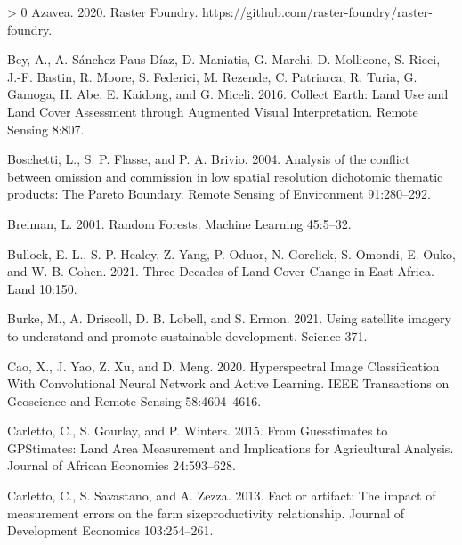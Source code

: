 \documentclass[11pt,a4paper]{article}
\newlength{\cslhangindent}
\newenvironment{CSLReferences}[3] %
 {%
  \setlength{\parindent}{0pt}
  \ifodd #1 \everypar{\setlength{\hangindent}{\cslhangindent}}\ignorespaces\fi
  \ifnum #2 > 0
  \setlength{\parskip}{#2\baselineskip}
  \fi
 }%
 {}
\begin{document}
\hypertarget{refs}{}
\begin{CSLReferences}{1}{0}
\leavevmode\hypertarget{ref-azaveaRasterFoundry2020}{}%
Azavea. 2020. Raster {Foundry}.
https://github.com/raster-foundry/raster-foundry.

\leavevmode\hypertarget{ref-BeyCollectEarthLand2016}{}%
Bey, A., A. Sánchez-Paus Díaz, D. Maniatis, G. Marchi, D. Mollicone, S.
Ricci, J.-F. Bastin, R. Moore, S. Federici, M. Rezende, C. Patriarca, R.
Turia, G. Gamoga, H. Abe, E. Kaidong, and G. Miceli. 2016. Collect
{Earth}: {Land Use} and {Land Cover Assessment} through {Augmented
Visual Interpretation}. Remote Sensing 8:807.

\leavevmode\hypertarget{ref-boschettiAnalysisConflictOmission2004}{}%
Boschetti, L., S. P. Flasse, and P. A. Brivio. 2004. Analysis of the
conflict between omission and commission in low spatial resolution
dichotomic thematic products: {The Pareto Boundary}. Remote Sensing of
Environment 91:280--292.

\leavevmode\hypertarget{ref-BreimanRandomForests2001}{}%
Breiman, L. 2001. Random {Forests}. Machine Learning 45:5--32.

\leavevmode\hypertarget{ref-bullockThreeDecadesLand2021}{}%
Bullock, E. L., S. P. Healey, Z. Yang, P. Oduor, N. Gorelick, S. Omondi,
E. Ouko, and W. B. Cohen. 2021. Three {Decades} of {Land Cover Change}
in {East Africa}. Land 10:150.

\leavevmode\hypertarget{ref-burkeUsingSatelliteImagery2021}{}%
Burke, M., A. Driscoll, D. B. Lobell, and S. Ermon. 2021. Using
satellite imagery to understand and promote sustainable development.
Science 371.

\leavevmode\hypertarget{ref-caoHyperspectralImageClassification2020}{}%
Cao, X., J. Yao, Z. Xu, and D. Meng. 2020. Hyperspectral {Image
Classification With Convolutional Neural Network} and {Active Learning}.
IEEE Transactions on Geoscience and Remote Sensing 58:4604--4616.

\leavevmode\hypertarget{ref-CarlettoGuesstimatesGPStimatesLand2015}{}%
Carletto, C., S. Gourlay, and P. Winters. 2015. From {Guesstimates} to
{GPStimates}: {Land Area Measurement} and {Implications} for
{Agricultural Analysis}. Journal of African Economies 24:593--628.

\leavevmode\hypertarget{ref-CarlettoFactartifactimpact2013}{}%
Carletto, C., S. Savastano, and A. Zezza. 2013. Fact or artifact: {The}
impact of measurement errors on the farm size{}productivity
relationship. Journal of Development Economics 103:254--261.


\end{CSLReferences}
\end{document}
